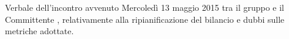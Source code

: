 Verbale dell'incontro avvenuto Mercoledì 13 maggio 2015 tra il gruppo \gruppo e il Committente \committente, relativamente alla ripianificazione del bilancio e dubbi sulle metriche adottate.
